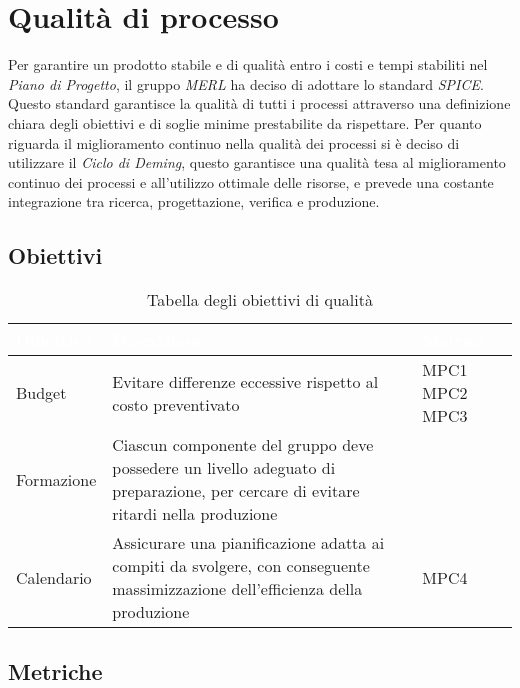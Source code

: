 \chapter{Qualità di processo}
Per garantire un prodotto stabile e di qualità entro i costi e tempi stabiliti nel \textit{Piano di Progetto}, il gruppo \textit{MERL} ha deciso di adottare lo standard \textit{SPICE}. Questo standard garantisce la qualità di tutti i processi attraverso una definizione chiara degli obiettivi e di soglie minime prestabilite da rispettare.
Per quanto riguarda il miglioramento continuo nella qualità dei processi si è deciso di utilizzare il \textit{Ciclo di Deming}, questo garantisce una qualità tesa al miglioramento continuo dei processi e all'utilizzo ottimale delle risorse, e prevede una costante integrazione tra ricerca, progettazione, verifica e produzione.

\section{Obiettivi}
\begin{table}[H]
  \renewcommand{\arraystretch}{1.25}
  \begin{tabular}{|p{2.5cm}|p{8cm}|p{1.7cm}|} \hline
    \rowcolor[HTML]{036400}
    \textcolor{white}{\textbf{Obiettivo}} & \textcolor{white}{\textbf{Descrizione}} & \textcolor{white}{\textbf{Metrica}}  \\ \hline
    \rowcolor[HTML]{EFEFEF}
    Budget & Evitare differenze eccessive rispetto al costo preventivato & MPC1 \newline MPC2 \newline MPC3     \\ \hline
    \rowcolor[HTML]{C0C0C0}
    Formazione & Ciascun componente del gruppo deve possedere un livello adeguato di preparazione, per cercare di evitare ritardi nella produzione   & \    \\ \hline
    \rowcolor[HTML]{EFEFEF}
    Calendario & Assicurare una pianificazione adatta ai compiti da svolgere, con conseguente massimizzazione dell'efficienza della produzione  & MPC4       \\ \hline
  \end{tabular}
  \caption{Tabella degli obiettivi di qualità}
\end{table}

\newpage

\section{Metriche}

